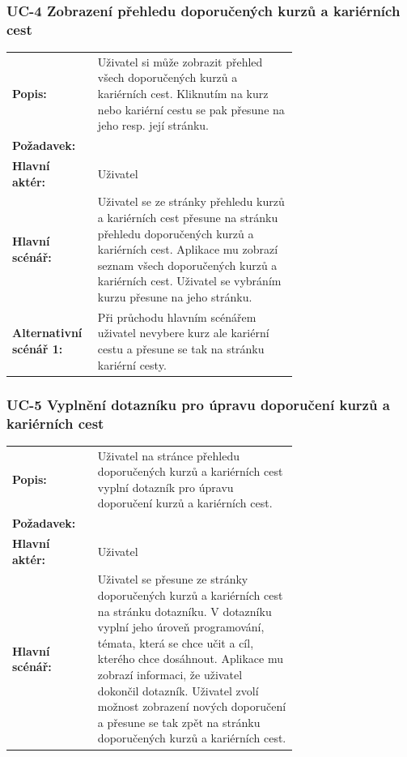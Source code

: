 \subsubsection{UC-4 Zobrazení přehledu doporučených kurzů a kariérních cest}

\begin{tabular}{lp{0.7\linewidth}}
  \textbf{Popis:} & Uživatel si může zobrazit přehled všech doporučených kurzů a kariérních cest. Kliknutím na kurz nebo kariérní cestu se pak přesune na jeho resp. její stránku. \\
  \textbf{Požadavek:} & \nameref{sec:fp-course-browse} \\
  \textbf{Hlavní aktér:} & Uživatel \\
  \textbf{Hlavní scénář:} & Uživatel se ze stránky přehledu kurzů a kariérních cest přesune na stránku přehledu doporučených kurzů a kariérních cest. Aplikace mu zobrazí seznam všech doporučených kurzů a kariérních cest. Uživatel se vybráním kurzu přesune na jeho stránku. \\
  \textbf{Alternativní scénář 1:} & Při průchodu hlavním scénářem uživatel nevybere kurz ale kariérní cestu a přesune se tak na stránku kariérní cesty. \\
\end{tabular}

\subsubsection{UC-5 Vyplnění dotazníku pro úpravu doporučení kurzů a kariérních cest}

\begin{tabular}{lp{0.7\linewidth}}
  \textbf{Popis:} & Uživatel na stránce přehledu doporučených kurzů a kariérních cest vyplní dotazník pro úpravu doporučení kurzů a kariérních cest. \\
  \textbf{Požadavek:} & \nameref{sec:fp-course-browse} \\
  \textbf{Hlavní aktér:} & Uživatel \\
  \textbf{Hlavní scénář:} & Uživatel se přesune ze stránky doporučených kurzů a kariérních cest na stránku dotazníku. V dotazníku vyplní jeho úroveň programování, témata, která se chce učit a cíl, kterého chce dosáhnout. Aplikace mu zobrazí informaci, že uživatel dokončil dotazník. Uživatel zvolí možnost zobrazení nových doporučení a přesune se tak zpět na stránku doporučených kurzů a kariérních cest. \\
\end{tabular}

